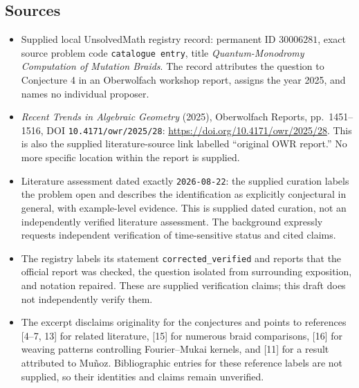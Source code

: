\documentclass[11pt]{article}
\begin{document}
\subsection{Sources}
\begin{itemize}
\item Supplied local UnsolvedMath registry record: permanent ID \(30006281\), exact source problem code \texttt{catalogue entry}, title \emph{Quantum-Monodromy Computation of Mutation Braids}. The record attributes the question to Conjecture 4 in an Oberwolfach workshop report, assigns the year 2025, and names no individual proposer.
\item \emph{Recent Trends in Algebraic Geometry} (2025), Oberwolfach Reports, pp.\ 1451--1516, DOI \texttt{10.4171/owr/2025/28}: \url{https://doi.org/10.4171/owr/2025/28}. This is also the supplied literature-source link labelled ``original OWR report.'' No more specific location within the report is supplied.
\item Literature assessment dated exactly \texttt{2026-08-22}: the supplied curation labels the problem open and describes the identification as explicitly conjectural in general, with example-level evidence. This is supplied dated curation, not an independently verified literature assessment. The background expressly requests independent verification of time-sensitive status and cited claims.
\item The registry labels its statement \texttt{corrected\_verified} and reports that the official report was checked, the question isolated from surrounding exposition, and notation repaired. These are supplied verification claims; this draft does not independently verify them.
\item The excerpt disclaims originality for the conjectures and points to references [4--7, 13] for related literature, [15] for numerous braid comparisons, [16] for weaving patterns controlling Fourier--Mukai kernels, and [11] for a result attributed to Mu\~noz. Bibliographic entries for these reference labels are not supplied, so their identities and claims remain unverified.
\end{itemize}
\end{document}
